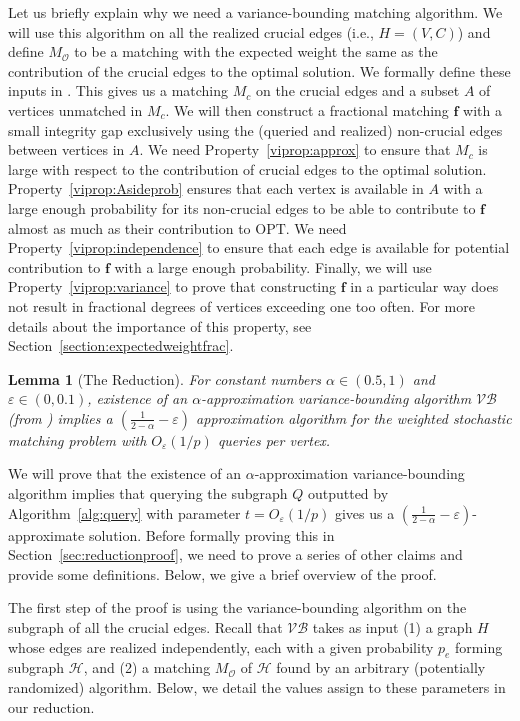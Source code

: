 \documentclass[letterpaper,11pt]{article}
\renewcommand{\epsilon}{\varepsilon}
\newcommand{\mc}[1]{\ensuremath{\mathcal{#1}}}
\newcommand{\opt}[0]{\text{OPT}}
\newcommand{\VB}[0]{\ensuremath{\mathcal{VB}}}
\newcommand{\apx}[0]{\ensuremath{\mathcal{\alpha}}}
\renewcommand{\epsilon}[0]{\ensuremath{\varepsilon}}
\newtheorem{lemma}{Lemma}[section]
\renewcommand{\mc}[1]{\ensuremath{\mathcal{#1}}}
\begin{document}
Let us briefly explain why we need a variance-bounding matching algorithm. We will use this algorithm on all the realized crucial edges (i.e., $H=(V, C)$) and define $M_{\mc{O}}$ to be a matching with the  expected weight the same as the contribution of the crucial edges to the optimal solution. We formally define these  inputs in . This gives us a matching $M_c$ on the crucial edges and a subset $A$ of vertices unmatched in  $M_c$.  We will then construct a fractional matching $\bm{f}$ with a small integrity gap exclusively using the (queried and realized) non-crucial edges between vertices in $A$. We need Property~\ref{viprop:approx} to ensure that $M_c$ is large with respect to the contribution of crucial edges to the optimal solution. Property~\ref{viprop:Asideprob} ensures that each vertex is available in $A$ with a large enough probability for its non-crucial edges to be able to contribute to $\bm{f}$ almost as much as their contribution to $\opt$. We need Property~\ref{viprop:independence} to ensure that each edge is available for potential contribution to $\bm{f}$ with a large enough probability. Finally, we will use Property~\ref{viprop:variance} to prove that constructing $\bm{f}$ in a particular way does not result in fractional degrees of vertices exceeding one too often. For more details about the importance of this property, see Section~\ref{section:expectedweightfrac}.

\begin{lemma}[The Reduction]\label{lem:reduction}
For constant numbers $\apx\in (0.5,1)$ and $\epsilon\in (0,0.1)$, existence of an \apx-approximation variance-bounding algorithm $\VB$ (from ) implies a $(\frac{1}{2-\apx}-\epsilon)$
approximation algorithm for the weighted stochastic matching problem with $O_\epsilon(1/p)$ queries per vertex. 
\end{lemma}



We will prove that the existence of an \apx-approximation variance-bounding algorithm implies that querying the subgraph $Q$ outputted by Algorithm~\ref{alg:query} with parameter $t=O_\epsilon(1/p)$ gives us a $(\frac{1}{2-\apx}-\epsilon)$-approximate solution. Before formally proving this in Section~\ref{sec:reductionproof}, we need to prove a series of other claims and provide some definitions. Below, we give a brief overview of the proof.


The first step of the proof is using the variance-bounding algorithm on the subgraph of all the crucial edges.  Recall that $\VB$ takes as input (1)  a graph $H$ whose edges are realized independently, each with a given probability $p_e$ forming subgraph $\mathcal{H}$,  and (2) a matching $M_{\mc{O}}$ of $\mathcal{H}$ found by an arbitrary (potentially randomized) algorithm. 
Below, we detail the values assign to these parameters in  our reduction. 
\end{document}

